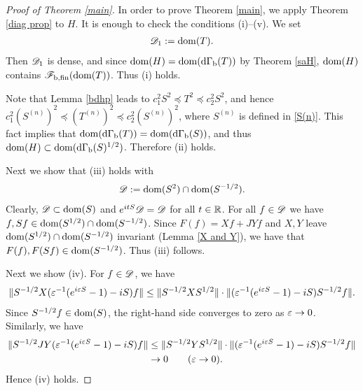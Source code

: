 \documentclass[12pt]{article}
\theoremstyle{plain}
\numberwithin{equation}{section}
\theoremstyle{remark}
\begin{document}
\begin{proof}[Proof of Theorem \ref{main}]
In order to prove Theorem \ref{main}, we apply Theorem \ref{diag prop} to $H$.
It is enough to check the conditions (i)--(v).
We set 
\begin{align*}
 \mathscr{D}_1 := \mathop{\mathrm{dom}}(T).  
\end{align*}
Then $\mathscr{D}_1$ is dense, and since $\mathop{\mathrm{dom}}(H)=\mathop{\mathrm{dom}}(\mathrm{d\Gamma_b}(T))$ by Theorem \ref{saH}, $\mathop{\mathrm{dom}}(H)$ contains $\mathscr{F}_\mathrm{b,fin}(\mathop{\mathrm{dom}}(T))$.
Thus (i) holds.

Note that Lemma \ref{bdhp} leads to $c_1^2 S^2 \preceq T^2 \preceq c_2^2S^2$, 
and hence $c_1^2 \left(S^{(n)}\right)^2 \preceq \left(T^{(n)}\right)^2 \preceq c_2^2\left(S^{(n)}\right)^2$, where $S^{(n)}$ is defined in \eqref{S(n)}.
This fact implies that $\mathop{\mathrm{dom}}(\mathrm{d\Gamma_b}(T))=\mathop{\mathrm{dom}}(\mathrm{d\Gamma_b}(S))$, and thus $\mathop{\mathrm{dom}}(H)\subset\mathop{\mathrm{dom}}(\mathrm{d\Gamma_b}(S)^{1/2})$.
Therefore (ii) holds.

Next we show that (iii) holds with
\begin{align*}
 \mathscr{D}:=\mathop{\mathrm{dom}}(S^2)\cap\mathop{\mathrm{dom}}(S^{-1/2}).  
\end{align*}
Clearly, $\mathscr{D}\subset \mathop{\mathrm{dom}}(S)$ and $e^{itS}\mathscr{D} = \mathscr{D}$ for all $t\in\mathbb{R}$.
For all $f\in\mathscr{D}$ we have $f,Sf \in \mathop{\mathrm{dom}}(S^{1/2})\cap\mathop{\mathrm{dom}}(S^{-1/2})$.
Since $F(f)=Xf+JYf$ and $X,Y$ leave $\mathop{\mathrm{dom}}(S^{1/2})\cap\mathop{\mathrm{dom}}(S^{-1/2})$ invariant (Lemma \ref{X and Y}),
we have that $F(f),F(Sf)\in\mathop{\mathrm{dom}}(S^{-1/2})$. Thus (iii) follows.

Next we show (iv). For $f\in\mathscr{D}$, we have
\begin{align*}
  \| S^{-1/2}X(\varepsilon^{-1}(e^{i\varepsilon S}-1)-iS)f \| 
\leq \| S^{-1/2}XS^{1/2} \|\cdot \| (\varepsilon^{-1}(e^{i\varepsilon S}-1)-iS)S^{-1/2}f \|.
\end{align*}
Since $S^{-1/2}f\in\mathop{\mathrm{dom}}(S)$, the right-hand side converges to zero as $\varepsilon\to 0$. 
Similarly, we have
\begin{align*}
  \| S^{-1/2} JY(\varepsilon^{-1}(e^{i\varepsilon S}-1)-iS)f \| 
&\leq \| S^{-1/2}YS^{1/2} \|\cdot \| (\varepsilon^{-1}(e^{i\varepsilon S}-1)-iS)S^{-1/2}f \| \\
& \to 0 \qquad (\varepsilon\to 0).
\end{align*}
 Hence (iv) holds.


\end{proof}
\end{document}
